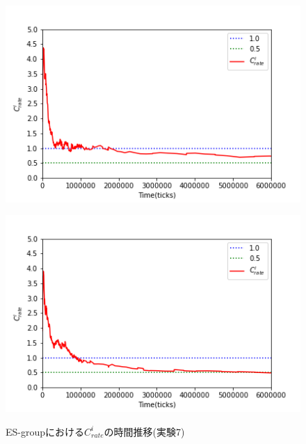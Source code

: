 \documentclass[12pt,a4j,twoside]{jarticle}
\begin{document}
  \begin{figure}
    \begin{minipage}{0.48\hsize}
      \centering
      \includegraphics[width=0.99\hsize]{figures/Rate_Office_ESgroup_0.png}
      \label{subfig:rate_Office_ES_0}
    \end{minipage}
    \hfill
    \begin{minipage}{0.48\hsize}
      \centering
      \includegraphics[width=0.99\hsize]{figures/Rate_Office_ESgroup_7.png}
      \label{subfig:rate_Office_ES_7}
    \end{minipage}
    \caption{ES-groupにおける$C^i_{rate}$の時間推移(実験7)}
    \label{fig:rate_Office_ES}
  \end{figure}
\end{document}
